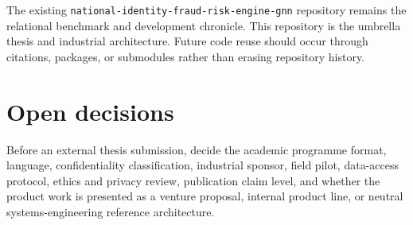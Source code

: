 The existing \texttt{national-identity-fraud-risk-engine-gnn} repository remains the relational benchmark and development chronicle. This repository is the umbrella thesis and industrial architecture. Future code reuse should occur through citations, packages, or submodules rather than erasing repository history.

\section{Open decisions}

Before an external thesis submission, decide the academic programme format, language, confidentiality classification, industrial sponsor, field pilot, data-access protocol, ethics and privacy review, publication claim level, and whether the product work is presented as a venture proposal, internal product line, or neutral systems-engineering reference architecture.

